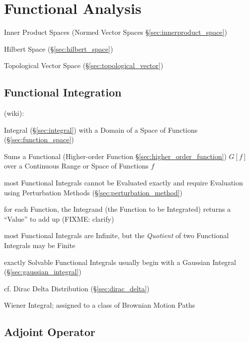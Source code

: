 \section{Functional Analysis}\label{sec:functional_analysis}

Inner Product Spaces (Normed Vector Spaces
\S\ref{sec:innerproduct_space})

Hilbert Space (\S\ref{sec:hilbert_space})

Topological Vector Space (\S\ref{sec:topological_vector})



\subsection{Functional Integration}\label{sec:functional_integration}

(wiki):

Integral (\S\ref{sec:integral}) with a Domain of a Space of Functions
(\S\ref{sec:function_space})

Sums a Functional (Higher-order Function \S\ref{sec:higher_order_function})
$G[f]$ over a Continuous Range or Space of Functions $f$

most Functional Integrals cannot be Evaluated exactly and require Evaluation
using Perturbation Methods (\S\ref{sec:perturbation_method})

for each Function, the Integrand (the Function to be Integrated) returns a
``Value'' to add up (FIXME: clarify)

most Functional Integrals are Infinite, but the \emph{Quotient} of two
Functional Integrals may be Finite

exactly Solvable Functional Integrals usually begin with a Gaussian Integral
(\S\ref{sec:gaussian_integral})

cf. Dirac Delta Distribution (\S\ref{sec:dirac_delta})

Wiener Integral; assigned to a class of Brownian Motion Paths



\subsection{Adjoint Operator}\label{sec:adjoint_operator}

